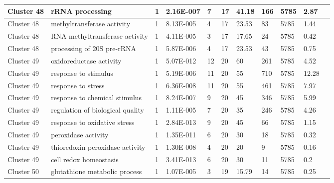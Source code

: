 \begin{tabular}{|l|l|l|l|l|l|l|l|l|l|l|}
\hline
Cluster 48&rRNA processing&1&2.16E-007&7&17&41.18&166&5785&2.87&\\
\hline
Cluster 48&methyltransferase activity&1&8.13E-005&4&17&23.53&83&5785&1.44&\\
\hline
Cluster 48&RNA methyltransferase activity&1&4.11E-005&3&17&17.65&24&5785&0.42&\\
\hline
Cluster 48&processing of 20S pre-rRNA&1&5.87E-006&4&17&23.53&43&5785&0.75&\\
\hline
Cluster 49&oxidoreductase activity&1&5.07E-012&12&20&60&261&5785&4.52&\\
\hline
Cluster 49&response to stimulus&1&5.19E-006&11&20&55&710&5785&12.28&\\
\hline
Cluster 49&response to stress&1&6.36E-008&11&20&55&461&5785&7.97&\\
\hline
Cluster 49&response to chemical stimulus&1&8.24E-007&9&20&45&346&5785&5.99&\\
\hline
Cluster 49&regulation of biological quality&1&1.11E-005&7&20&35&246&5785&4.26&\\
\hline
Cluster 49&response to oxidative stress&1&2.84E-013&9&20&45&66&5785&1.15&\\
\hline
Cluster 49&peroxidase activity&1&1.35E-011&6&20&30&18&5785&0.32&\\
\hline
Cluster 49&thioredoxin peroxidase activity&1&1.30E-008&4&20&20&9&5785&0.16&\\
\hline
Cluster 49&cell redox homeostasis&1&3.41E-013&6&20&30&11&5785&0.2&\\
\hline
Cluster 50&glutathione metabolic process&1&1.07E-005&3&19&15.79&14&5785&0.25&\\
\hline
\end{tabular}


